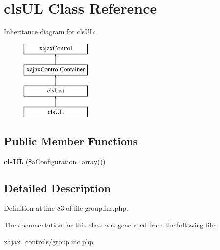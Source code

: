 \hypertarget{classclsUL}{
\section{clsUL Class Reference}
\label{classclsUL}
}
Inheritance diagram for clsUL:\begin{figure}[H]
\begin{center}
\leavevmode
\includegraphics[height=4.000000cm]{classclsUL}
\end{center}
\end{figure}
\subsection*{Public Member Functions}
\begin{DoxyCompactItemize}
\item 
\hypertarget{classclsUL_a0cca2df7be9ab2b692a61839ed330447}{
{\bfseries clsUL} (\$aConfiguration=array())}
\label{classclsUL_a0cca2df7be9ab2b692a61839ed330447}

\end{DoxyCompactItemize}


\subsection{Detailed Description}


Definition at line 83 of file group.inc.php.



The documentation for this class was generated from the following file:\begin{DoxyCompactItemize}
\item 
xajax\_\-controls/group.inc.php\end{DoxyCompactItemize}
